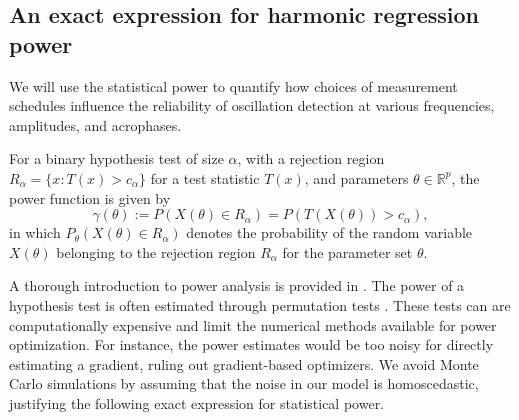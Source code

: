 \subsection{An exact expression for harmonic regression power }
We will use the statistical power to quantify how choices of measurement schedules influence the reliability of oscillation detection at various frequencies, amplitudes, and acrophases. 
\begin{defn}
  For a binary hypothesis test of size $\alpha$, with a rejection region $R_\alpha=\{x: T(x)>c_\alpha\}$ for a test statistic $T(x)$, and parameters $\theta\in\mathbb{R}^p$, the power function is given by
  \begin{equation}
    \gamma(\theta) :=P(X(\theta) \in R_\alpha)=P(T(X(\theta)) > c_\alpha),
  \end{equation}
in which $P_\theta(X(\theta) \in R_\alpha)$ denotes the probability of the random variable $X(\theta)$ belonging to the rejection region $R_\alpha$ for the parameter set $\theta$.
\end{defn}
A thorough introduction to power analysis is provided in \cite{wassermanTextbook}. The power of a hypothesis test is often estimated through permutation tests \cite{Boos2000-hd}. These tests can are computationally expensive and limit the numerical methods available for power optimization. For instance, the power estimates would be too noisy for directly estimating a gradient, ruling out gradient-based optimizers. We avoid Monte Carlo simulations by assuming that the noise in our model is homoscedastic, justifying the following exact expression for statistical power.

